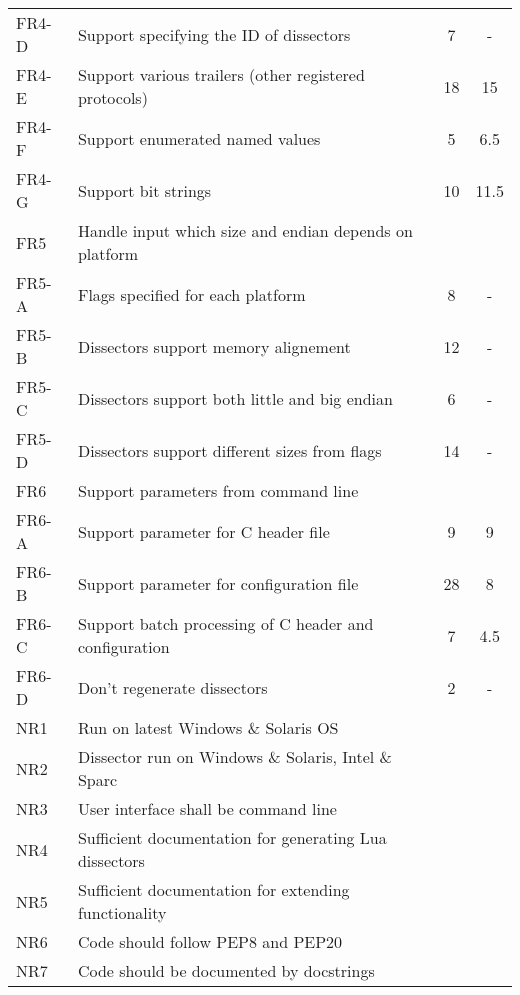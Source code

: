 \begin{table}[ht]
\begin{tabularx}{\textwidth}{l X c c}
	FR4-D & Support specifying the ID of dissectors & 7 & - \\
	FR4-E & Support various trailers (other registered protocols) & 18 & 15 \\
	FR4-F & Support enumerated named values  & 5 & 6.5 \\
	FR4-G & Support bit strings & 10 & 11.5 \\
	\addlinespace
	FR5 & Handle input which size and endian depends on platform & & \\
	FR5-A & Flags specified for each platform & 8 & - \\
	FR5-B & Dissectors support memory alignement & 12 & - \\
	FR5-C & Dissectors support both little and big endian & 6 & - \\
	FR5-D & Dissectors support different sizes from flags & 14 & - \\	
	\addlinespace
	FR6 & Support parameters from command line & & \\
	FR6-A & Support parameter for C header file & 9 & 9 \\
	FR6-B & Support parameter for configuration file & 28 & 8 \\
	FR6-C & Support batch processing of C header and configuration & 7 & 4.5 \\
	FR6-D & Don't regenerate dissectors & 2 & - \\
	\addlinespace
	NR1 & Run on latest Windows \& Solaris OS & & \\
	NR2 & Dissector run on Windows \& Solaris, Intel \& Sparc & & \\
	NR3 & User interface shall be command line & & \\
	NR4 & Sufficient documentation for generating Lua dissectors & & \\
	NR5 & Sufficient documentation for extending functionality & & \\
	NR6 & Code should follow PEP8 and PEP20 & & \\
	NR7 & Code should be documented by docstrings & & \\
	\bottomrule
\end{tabularx}
\end{table}

